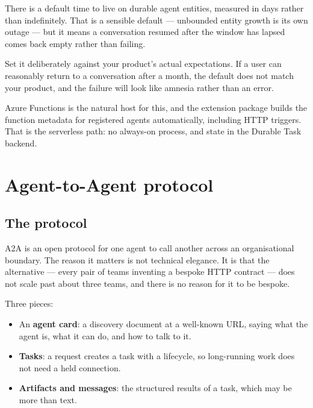 \begin{warning}
There is a default time to live on durable agent entities, measured in days
rather than indefinitely. That is a sensible default --- unbounded entity growth
is its own outage --- but it means a conversation resumed after the window has
lapsed comes back empty rather than failing.

Set it deliberately against your product's actual expectations. If a user can
reasonably return to a conversation after a month, the default does not match
your product, and the failure will look like amnesia rather than an error.
\end{warning}

Azure Functions is the natural host for this, and the extension package builds
the function metadata for registered agents automatically, including HTTP
triggers. That is the serverless path: no always-on process, and state in the
Durable Task backend.

\section{Agent-to-Agent protocol}
\label{sec:host-a2a}

\subsection{The protocol}

A2A is an open protocol for one agent to call another across an organisational
boundary. The reason it matters is not technical elegance. It is that the
alternative --- every pair of teams inventing a bespoke HTTP contract --- does not
scale past about three teams, and there is no reason for it to be bespoke.

Three pieces:

\begin{itemize}[leftmargin=1.4em]
\item An \textbf{agent card}: a discovery document at a well-known URL, saying
      what the agent is, what it can do, and how to talk to it.
\item \textbf{Tasks}: a request creates a task with a lifecycle, so long-running
      work does not need a held connection.
\item \textbf{Artifacts and messages}: the structured results of a task, which
      may be more than text.
\end{itemize}


